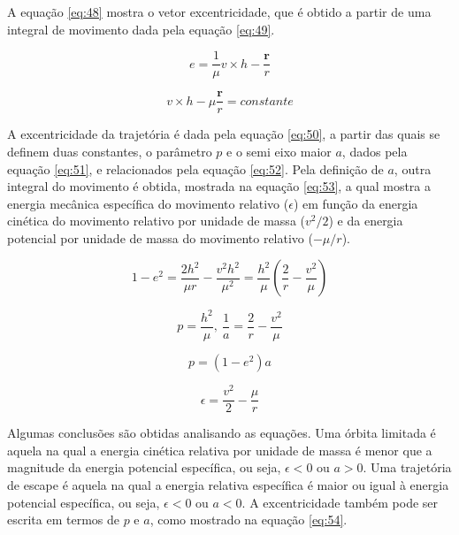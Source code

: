 A equação \ref{eq:48} mostra o vetor excentricidade, que é obtido a partir de uma integral de movimento dada pela equação \ref{eq:49}.

\begin{equation}
e = \frac{1}{\mu}v \times h - \frac{\textbf{r}}{r}
\label{eq:48}
\end{equation}

\begin{equation}
    v \times h - \mu\frac{\textbf{r}}{r} = constante
    \label{eq:49}
\end{equation}

A excentricidade da trajetória é dada pela equação \ref{eq:50}, a partir das quais se definem duas constantes, o parâmetro $p$ e o semi eixo maior $a$, dados pela equação \ref{eq:51}, e relacionados pela equação \ref{eq:52}. Pela definição de $a$, outra integral do movimento é obtida, mostrada na equação \ref{eq:53}, a qual mostra a energia mecânica específica do movimento relativo ($\epsilon$) em função da energia cinética do movimento relativo por unidade de massa ($v^{2}/2$) e da energia potencial por unidade de massa do movimento relativo ($-\mu /r$).

\begin{equation}
    1-e^{2} = \frac{2h^{2}}{\mu r} - \frac{v^{2} h^{2}}{\mu^{2}} = \frac{h^{2}}{\mu} \left(    \frac{2}{r} - \frac{v^{2}}{\mu} \right)
    \label{eq:50}
\end{equation}

\begin{equation}
    p = \frac{h^{2}}{\mu}, \ \frac{1}{a} = \frac{2}{r} - \frac{v^{2}}{\mu}
    \label{eq:51}
\end{equation}

\begin{equation}
    p = (1-e^{2})a
    \label{eq:52}
\end{equation}

\begin{equation}
    \epsilon = \frac{v^{2}}{2} - \frac{\mu}{r}
    \label{eq:53}
\end{equation}

Algumas conclusões são obtidas analisando as equações. Uma órbita limitada é aquela na qual a energia cinética relativa por unidade de massa é menor que a magnitude da energia potencial específica, ou seja, $\epsilon < 0$ ou $a > 0$. Uma trajetória de escape é aquela na qual a energia relativa específica é maior ou igual à energia potencial específica, ou seja, $\epsilon < 0 $ ou $a<0$. A excentricidade também pode ser escrita em termos de $p$ e $a$, como mostrado na equação \ref{eq:54}.

